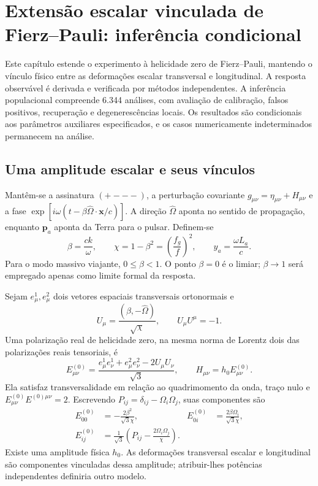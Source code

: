 \chapter[Helicidade zero]{Extensão escalar vinculada de Fierz--Pauli: inferência condicional}
\label{cap:c10-parcial}

Este capítulo estende o experimento à helicidade zero de Fierz--Pauli, mantendo o vínculo físico entre as deformações escalar transversal e longitudinal. A resposta observável é derivada e verificada por métodos independentes. A inferência populacional compreende 6.344 análises, com avaliação de calibração, falsos positivos, recuperação e degenerescências locais. Os resultados são condicionais aos parâmetros auxiliares especificados, e os casos numericamente indeterminados permanecem na análise.

\section{Uma amplitude escalar e seus vínculos}

Mantêm-se a assinatura $(+---)$, a perturbação covariante $g_{\mu\nu}=\eta_{\mu\nu}+H_{\mu\nu}$ e a fase $\exp[i\omega(t-\beta\widehat\Omega\cdot\boldsymbol{x}/c)]$. A direção $\widehat\Omega$ aponta no sentido de propagação, enquanto $\boldsymbol p_a$ aponta da Terra para o pulsar. Definem-se
\begin{equation}
 \beta=\frac{ck}{\omega},\qquad
 \chi=1-\beta^2=\left(\frac{f_g}{f}\right)^2,
 \qquad y_a=\frac{\omega L_a}{c}.
\end{equation}
Para o modo massivo viajante, $0\leq\beta<1$. O ponto $\beta=0$ é o limiar; $\beta\to1$ será empregado apenas como limite formal da resposta.

Sejam $e^1_\mu,e^2_\mu$ dois vetores espaciais transversais ortonormais e
\begin{equation}
 U_\mu=\frac{(\beta,-\widehat\Omega)}{\sqrt\chi},
 \qquad U_\mu U^\mu=-1.
\end{equation}
Uma polarização real de helicidade zero, na mesma norma de Lorentz dois das polarizações reais tensoriais, é
\begin{equation}
 E^{(0)}_{\mu\nu}=\frac{e^1_\mu e^1_\nu+e^2_\mu e^2_\nu-2U_\mu U_\nu}{\sqrt3},
 \qquad H_{\mu\nu}=h_0E^{(0)}_{\mu\nu}.
\end{equation}
Ela satisfaz transversalidade em relação ao quadrimomento da onda, traço nulo e $E^{(0)}_{\mu\nu}E^{(0)\mu\nu}=2$. Escrevendo $P_{ij}=\delta_{ij}-\Omega_i\Omega_j$, suas componentes são
\begin{align}
 E^{(0)}_{00}&=-\frac{2\beta^2}{\sqrt3\chi},&
 E^{(0)}_{0i}&=\frac{2\beta\Omega_i}{\sqrt3\chi},\\
 E^{(0)}_{ij}&=\frac1{\sqrt3}\left(P_{ij}-\frac{2\Omega_i\Omega_j}{\chi}\right).
\end{align}
Existe uma amplitude física $h_0$. As deformações transversal escalar e longitudinal são componentes vinculadas dessa amplitude; atribuir-lhes potências independentes definiria outro modelo.

